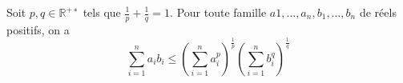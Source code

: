 %
%
%
\begin{cor}
	Soit $p,q \in \mathbb{R}^{+∗}$ tels
	que  $\frac{1}{p} + \frac{1}{q} = 1$.
Pour toute famille $a1,\ldots,a_n,b_1,\ldots,b_n$
de réels positifs, on a
\[
\sum_{i=1}^n a_i b_i \leq \left(\sum_{i=1}^{n} a_i^p\right)^{\frac{1}{p}} \left (\sum_{i=1}^{n} b_i^q \right)^{\frac{1}{q}}
\]
\end{cor}
%
%
%
%
